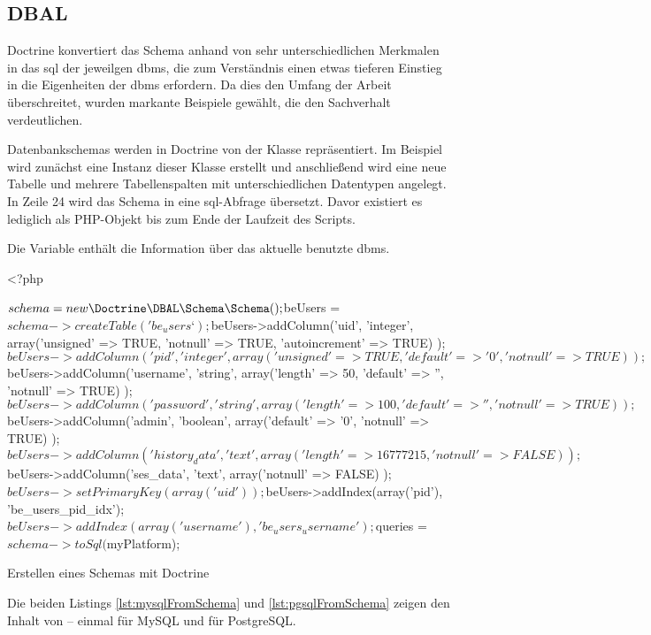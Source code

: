 \subsection{DBAL}
\label{basics:doctrine:subsec:dbal}
Doctrine konvertiert das Schema anhand von sehr unterschiedlichen Merkmalen in das \gls{sql} der jeweilgen \gls{dbms}, die zum Verständnis einen etwas tieferen Einstieg in die Eigenheiten der \gls{dbms} erfordern. Da dies den Umfang der Arbeit überschreitet, wurden markante Beispiele gewählt, die den Sachverhalt verdeutlichen.

Datenbankschemas werden in Doctrine von der Klasse  repräsentiert. Im Beispiel wird zunächst eine Instanz dieser Klasse erstellt und anschließend wird eine neue Tabelle und mehrere Tabellenspalten mit unterschiedlichen Datentypen angelegt. In Zeile 24 wird das Schema in eine \gls{sql}-Abfrage übersetzt. Davor existiert es lediglich als PHP-Objekt bis zum Ende der Laufzeit des Scripts.

Die Variable  enthält die Information über das aktuelle benutzte \gls{dbms}.

\begin{listing}[H]
\begin{phpcode}
<?php

$schema = new \Doctrine\DBAL\Schema\Schema();
$beUsers = $schema->createTable('be_users‘);
$beUsers->addColumn('uid', 'integer',
  array('unsigned' => TRUE, 'notnull' => TRUE, 'autoincrement' => TRUE)
);
$beUsers->addColumn('pid', 'integer',
  array('unsigned' => TRUE, 'default' => '0', 'notnull' => TRUE)
);
$beUsers->addColumn('username', 'string',
  array('length' => 50, 'default' => '', 'notnull' => TRUE)
);
$beUsers->addColumn('password', 'string',
  array('length' => 100, 'default' => '', 'notnull' => TRUE)
);
$beUsers->addColumn('admin', 'boolean',
  array('default' => '0', 'notnull' => TRUE)
);
$beUsers->addColumn('history_data', 'text',
  array('length' => 16777215, 'notnull' => FALSE)
);
$beUsers->addColumn('ses_data', 'text',
  array('notnull' => FALSE)
);
$beUsers->setPrimaryKey(array('uid'));
$beUsers->addIndex(array('pid'), 'be_users_pid_idx');
$beUsers->addIndex(array('username'), 'be_users_username');

$queries = $schema->toSql($myPlatform);
\end{phpcode}
\caption{Erstellen eines Schemas mit Doctrine}
\label{lst:createSchema}
\end{listing}

Die beiden Listings \ref{lst:mysqlFromSchema} und \ref{lst:pgsqlFromSchema} zeigen den Inhalt von  – einmal für MySQL und für PostgreSQL.

